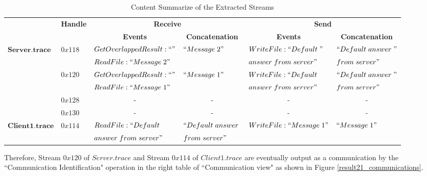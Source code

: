 \begin{table}[H]
  \tiny
  \centering
  \caption{Content Summarize of the Extracted Streams}
  \label{contentresult21}
  \begin{tabular}{|l|l|l|l|l|l|}
\hline            
& \multirow{2}{*}{\textbf{Handle}} & \multicolumn{2}{c|}{\textbf{Receive} }&\multicolumn{2}{c|}{\textbf{Send}} \\
\cline{3-6}
& &\multicolumn{1}{c|}{ \textbf{Events} }&\multicolumn{1}{c|}{\textbf{ Concatenation}}&\multicolumn{1}{c|}{ \textbf{Events} }&\multicolumn{1}{c|}{\textbf{ Concatenation}}\\
\hline 
\multirow{6}{*}{$\boldsymbol{Server.trace}$} &\multirow{2}{*}{$0x118$} & $GetOverlappedResult:``"$ & \multirow{2}{*}{$``Message\; 2"$} & $WriteFile:``Default\; "$ &  $``Default\; answer\; "$\\
\cline{3-3}
& &$ReadFile:``Message\; 2"$ &  & $answer\; from\; server"$&$from\; server"$\\
\cline{2-6}    
      &\multirow{2}{*}{$0x120$} & $GetOverlappedResult:``"$ & \multirow{2}{*}{$``Message\; 1"$} & $WriteFile:``Default\; $ &  $``Default\; answer\; "$\\
\cline{3-3}
& &$ReadFile:``Message\; 1"$ & &$answer\; from\; server"$ &$from\; server"$\\  
\cline{2-6}   
& $0x128$&\multicolumn{1}{c|}{- }&\multicolumn{1}{c|}{- } &\multicolumn{1}{c|}{- } &\multicolumn{1}{c|}{- }\\  
\cline{2-6}   
& $0x130$&\multicolumn{1}{c|}{- } &\multicolumn{1}{c|}{- } &\multicolumn{1}{c|}{- } &\multicolumn{1}{c|}{- }\\      
\hline  
\multirow{2}{*}{$\boldsymbol{Client1.trace}$ }&\multirow{2}{*}{$0x114$ }& $ReadFile: ``Default\; $ & $``Default\; answer\; $ & \multirow{2}{*}{$WriteFile:``Message\; 1"$ } &  \multirow{2}{*}{$``Message\; 1"$}\\
& &$answer\; from\; server"$& $ from\; server"$ & &\\
\hline
  \end{tabular}
\end{table}



Therefore, Stream $0x120$ of $Server.trace$ and Stream $0x114$ of $Client1.trace$ are eventually output as a communication by the ``Communication Identification" operation in the right table of ``Communication view" as shown in Figure \ref{result21_communications}. 

